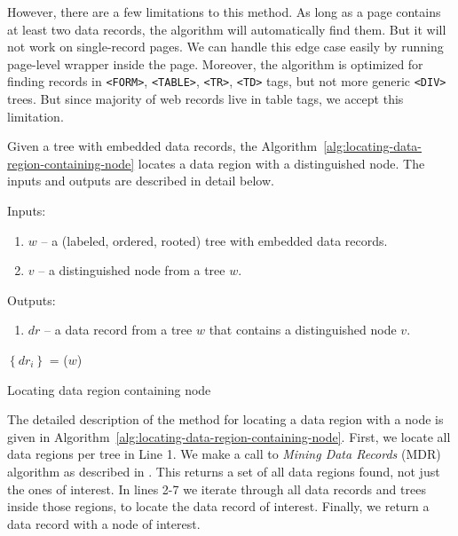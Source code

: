 However, there are a few limitations to this method. As long as a page contains at least two data records, the algorithm will automatically find them. But it will not work on single-record pages. We can handle this edge case easily by running page-level wrapper inside the page. Moreover, the algorithm is optimized for finding records in \texttt{<FORM>}, \texttt{<TABLE>}, \texttt{<TR>}, \texttt{<TD>} tags, but not more generic \texttt{<DIV>} trees. But since majority of web records live in table tags, we accept this limitation.

Given a tree with embedded data records, the Algorithm~\ref{alg:locating-data-region-containing-node} locates a data region with a distinguished node. The inputs and outputs are described in detail below.

Inputs: 

\begin{enumerate}
	\item $w$ -- a (labeled, ordered, rooted) tree with embedded data records.
	\item $v$ -- a distinguished node from a tree $w$.
\end{enumerate}

Outputs: 

\begin{enumerate}
	\item $dr$ -- a data record from a tree $w$ that contains a distinguished node $v$.
\end{enumerate}

\IncMargin{2em}
\begin{algorithm}[h]

	\DontPrintSemicolon

	\BlankLine

	$\left\{dr_i\right\}$ = \MDR($w$) \;
	 {
		 {
		}
	}

	\caption{Locating data region containing node}
	\label{alg:locating-data-region-containing-node}

\end{algorithm}
\DecMargin{2em}

The detailed description of the method for locating a data region with a node is given in Algorithm~\ref{alg:locating-data-region-containing-node}. First, we locate all data regions per tree in Line 1. We make a call to \emph{Mining Data Records} (MDR) algorithm as described in \cite{liu2009a}. This returns a set of all data regions found, not just the ones of interest. In lines 2-7 we iterate through all data records and trees inside those regions, to locate the data record of interest. Finally, we return a data record with a node of interest.

